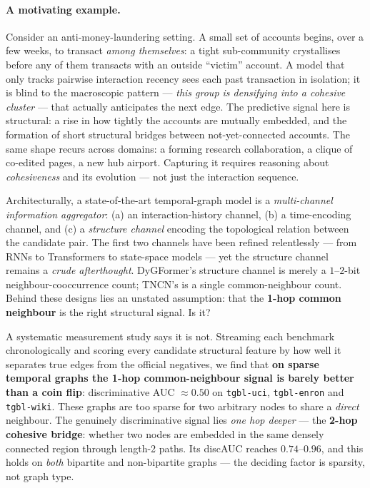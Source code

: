 \documentclass[sigconf,nonacm,review]{acmart}
\begin{document}
\paragraph{A motivating example.}
Consider an anti-money-laundering setting. A small set of accounts begins, over
a few weeks, to transact \emph{among themselves}: a tight sub-community
crystallises before any of them transacts with an outside ``victim'' account. A
model that only tracks pairwise interaction recency sees each past transaction
in isolation; it is blind to the macroscopic pattern --- \emph{this group is
densifying into a cohesive cluster} --- that actually anticipates the next
edge. The predictive signal here is structural: a rise in how tightly the
accounts are mutually embedded, and the formation of short structural bridges
between not-yet-connected accounts. The same shape recurs across domains: a
forming research collaboration, a clique of co-edited pages, a new hub airport.
Capturing it requires reasoning about \emph{cohesiveness} and its evolution ---
not just the interaction sequence.

Architecturally, a state-of-the-art temporal-graph model is a
\emph{multi-channel information aggregator}: (a) an interaction-history channel,
(b) a time-encoding channel, and (c) a \emph{structure channel} encoding the
topological relation between the candidate pair. The first two channels have
been refined relentlessly --- from RNNs to Transformers to state-space models
--- yet the structure channel remains a \emph{crude afterthought}. DyGFormer's
structure channel is merely a $1$--$2$-bit neighbour-cooccurrence count; TNCN's
is a single common-neighbour count. Behind these designs lies an unstated
assumption: that the \textbf{1-hop common neighbour} is the right structural
signal. Is it?

A systematic measurement study says it is not. Streaming each benchmark
chronologically and scoring every candidate structural feature by how well it
separates true edges from the official negatives, we find that \textbf{on
sparse temporal graphs the 1-hop common-neighbour signal is barely better than
a coin flip}: discriminative AUC $\approx 0.50$ on \texttt{tgbl-uci},
\texttt{tgbl-enron} and \texttt{tgbl-wiki}. These graphs are too sparse for two
arbitrary nodes to share a \emph{direct} neighbour. The genuinely
discriminative signal lies \emph{one hop deeper} --- the \textbf{2-hop cohesive
bridge}: whether two nodes are embedded in the same densely connected region
through length-2 paths. Its discAUC reaches $0.74$--$0.96$, and this holds on
\emph{both} bipartite and non-bipartite graphs --- the deciding factor is
sparsity, not graph type.
\end{document}
